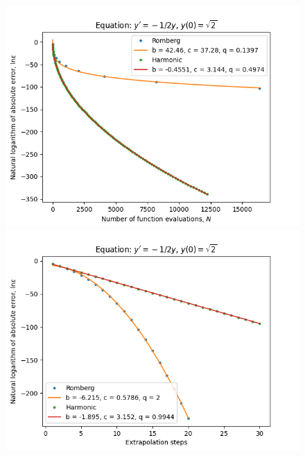 \begin{figure}[H]
\centering
\begin{minipage}{0.45\textwidth}
\centering
\includegraphics[scale=0.45]{../results/emr_plots/quad_sing_0_hp_trend.png}
\end{minipage}
\begin{minipage}{0.45\textwidth}
\centering
\includegraphics[scale=0.45]{../results/emr_plots/quad_sing_0_hp_steps.png}
\end{minipage}
\end{figure}

